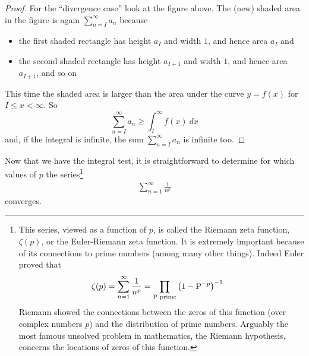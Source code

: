 \begin{proof}
For the ``divergence case'' look at the figure above.
The (new) shaded area in the figure is again $\sum_{n=I}^\infty a_n$
because
\begin{itemize}\itemsep1pt \parskip0pt  %
\item the first shaded rectangle has height $a_I$
and width $1$, and hence area $a_I$ and
\item the second shaded rectangle has height $a_{I+1}$
and width $1$, and hence area $a_{I+1}$, and so on
\end{itemize}
This time the shaded area is larger than the area under the curve
$y=f(x)$ for $I\le x<\infty$. So
\begin{equation*}
\sum_{n=I}^\infty a_n
\ge \int_I^\infty f(x)\ dx
\end{equation*}
and, if the integral is infinite, the sum $\sum_{n=I}^\infty a_n$ is infinite
too.


\end{proof}

Now that we have the integral test, it is straightforward to determine
for which values of $p$ the series\footnote{This series, viewed
as a function of $p$, is called the Riemann zeta function, $\zeta(p)$,
or the Euler-Riemann zeta function. It is extremely important because
of its connections to prime numbers (among many other things). Indeed
Euler proved that
\begin{align*}
\zeta(p) = \sum_{n=1}^\infty \frac{1}{n^p}
           &= \prod_{\text{P prime}} \left(1 - {\rm P}^{-p} \right)^{-1}
\end{align*}
Riemann showed the connections between the zeros of this function (over
complex numbers $p$) and the distribution of prime numbers. Arguably the
most famous unsolved problem in mathematics, the Riemann
hypothesis, concerns the locations of zeros of this function.
}
\begin{align*}
 \sum_{n=1}^\infty \frac{1}{n^p}
\end{align*}
converges.


